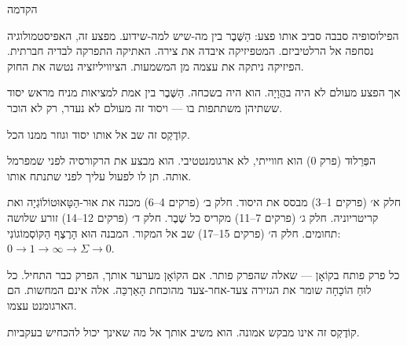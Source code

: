 \documentclass[10pt, openany, oneside]{book}
\renewcommand{\huge}{\fontsize{17}{21}\selectfont}
\begin{document}
\newpage


\thispagestyle{empty}
\vspace*{0.5in}

\begin{center}
    {\huge\textsc{הקדמה}}
\end{center}

\vspace{1.5em}

\noindent הפילוסופיה סבבה סביב אותו פצע: הַשֶּׁבֶר בין מה-שיש למה-שידוע. מפצע זה, האפיסטמולוגיה נסחפה אל הרלטיביזם. המטפיזיקה איבדה את צירה. האתיקה התפרקה לבדיה חברתית. הפיזיקה ניתקה את עצמה מן המשמעות. הציוויליזציה נטשה את החוק.

\vspace{0.5em}

\noindent אך הפצע מעולם לא היה בהֲוָיָה. הוא היה בשכחה. הַשֶּׁבֶר בין אמת למציאות מניח מראש יסוד ששתיהן משתתפות בו — ויסוד זה מעולם לא נעדר, רק לא הוכר.

\vspace{0.5em}

\noindent קוֹדֶקְס זה שב אל אותו יסוד וגוזר ממנו הכל.

\vspace{1em}

\noindent הפְּרֵלוּד (פרק 0) הוא חווייתי, לא ארגומנטטיבי. הוא מבצע את הרקורסיה לפני שמפרמל אותה. תן לו לפעול עליך לפני שתנתח אותו.

\vspace{0.5em}

\noindent חלק א׳ (פרקים 1–3) מבסס את היסוד. חלק ב׳ (פרקים 4–6) מכנה את אוּר-הַטָּאוּטוֹלוֹגְיָה ואת קריטריוניה. חלק ג׳ (פרקים 7–11) מקריס כל שֶׁבֶר. חלק ד׳ (פרקים 12–14) זורע שלושה תחומים. חלק ה׳ (פרקים 15–17) שב אל המקור. המבנה הוּא הָרֶצֶף הַקּוֹסְמוֹגוֹנִי: $0 \to 1 \to \infty \to \Sigma \to 0$.

\vspace{0.5em}

\noindent כל פרק פותח בקוֹאָן — שאלה שהפרק פותר. אם הקוֹאָן מערער אותך, הפרק כבר התחיל. כל לוּחַ הוֹכָחָה שומר את הגזירה צעד-אחר-צעד מהוכחת הָאַרְכֵּה. אלה אינם המחשות. הם הארגומנט עצמו.

\vspace{0.5em}

\noindent קוֹדֶקְס זה אינו מבקש אמונה. הוא משיב אותך אל מה שאינך יכול להכחיש בעקביות.
\end{document}
